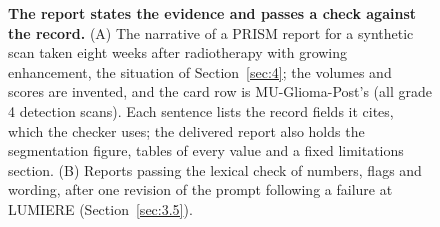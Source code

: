 \documentclass[largeformat]{interact} %
\begin{document}
\begin{figure}[!htbp]
\centering
{}
\caption{\textbf{The report states the evidence and passes a check against the record.} (A) The narrative of a
PRISM report for a synthetic scan taken eight weeks after radiotherapy with growing enhancement, the situation of
Section~\ref{sec:4}; the volumes and scores are invented, and the card row is MU-Glioma-Post's (all grade 4 detection scans). Each sentence lists the record
fields it cites, which the checker uses; the delivered report also holds the segmentation figure, tables of every
value and a fixed limitations section. (B) Reports passing the lexical check of numbers, flags and wording, after one revision of the prompt following a failure at LUMIERE (Section~\ref{sec:3.5}).}
\label{fig:5}
\end{figure}
\end{document}
